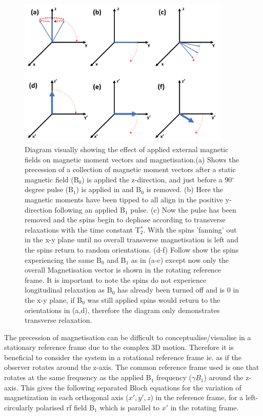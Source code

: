 \documentclass[class=article, crop=false]{standalone}
\begin{document}
\begin{figure}
    \centering
    \includegraphics[width=0.9\textwidth]{Figures/Theory/Magnetisation.png}
    \caption{Diagram visually showing the effect of applied external magnetic fields on magnetic moment vectors and magnetisation.(a) Shows the precession of a collection of magnetic moment vectors after a static magnetic field (B$_0$) is applied the z-direction, and just before a 90$^\circ$ degree pulse (B$_1$) is applied in and B$_0$ is removed. (b) Here the magnetic moments have been tipped to all align in the positive y-direction following an applied B$_1$ pulse. (c) Now the pulse has been removed and the spins begin to dephase according to transverse relaxations with the time constant T$_2^*$. With the spins 'fanning' out in the x-y plane until no overall transverse magnetisation is left and the spins return to random orientations. (d-f) Follow show the spins experiencing the same B$_0$ and B$_1$ as in (a-c) except now only the overall Magnetisation vector is shown in the rotating reference frame. It is important to note the spins do not experience longitudinal relaxation as B$_0$ has already been turned off and is 0 in the x-y plane, if B$_0$ was still applied spins would return to the orientations in (a,d), therefore the diagram only demonstrates transverse relaxation.}
    \label{fig:theory:Mag}
\end{figure}

The precession of magnetisation can be difficult to conceptualise/visualise in a stationary reference frame due to the complex 3D motion. Therefore it is beneficial to consider the system in a rotational reference frame ie. as if the observer rotates around the z-axis. The common reference frame used is one that rotates at the same frequency as the applied B$_1$ frequency ($\gamma B_1$) around the z-axis. This gives the following separated Bloch equations for the variation of magnetization in each orthogonal axis ($x',y',z$) in the reference frame, for a left-circularly polarised rf field B$_1$ which is parallel to $x'$ in the rotating frame.
\end{document}
